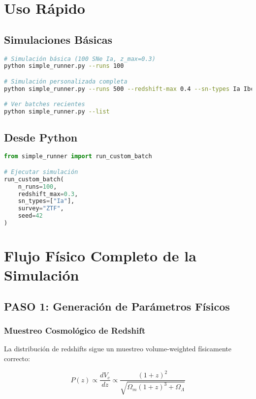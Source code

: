 \documentclass[11pt,a4paper]{article}
\begin{document}
\section{Uso Rápido}

\subsection{Simulaciones Básicas}

\begin{lstlisting}[language=bash, caption=Comandos básicos del sistema]
# Simulación básica (100 SNe Ia, z_max=0.3)
python simple_runner.py --runs 100

# Simulación personalizada completa
python simple_runner.py --runs 500 --redshift-max 0.4 --sn-types Ia Ibc II --survey ZTF

# Ver batches recientes
python simple_runner.py --list
\end{lstlisting}

\subsection{Desde Python}

\begin{lstlisting}[language=Python, caption=Interfaz Python]
from simple_runner import run_custom_batch

# Ejecutar simulación
run_custom_batch(
    n_runs=100,
    redshift_max=0.3,
    sn_types=["Ia"],
    survey="ZTF",
    seed=42
)
\end{lstlisting}

\section{Flujo Físico Completo de la Simulación}

\subsection{PASO 1: Generación de Parámetros Físicos}

\subsubsection{Muestreo Cosmológico de Redshift}

La distribución de redshifts sigue un muestreo volume-weighted físicamente correcto:

\begin{equation}
P(z) \propto \frac{dV_c}{dz} \propto \frac{(1+z)^2}{\sqrt{\Omega_m(1+z)^3 + \Omega_\Lambda}}
\end{equation}
\end{document}
